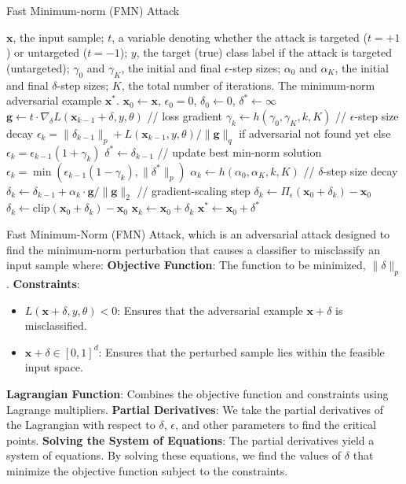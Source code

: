 \begin{algorithm}[H]
\caption{Fast Minimum-norm (FMN) Attack}
\begin{algorithmic}[1]
\Input $\mathbf{x}$, the input sample; $t$, a variable denoting whether the attack is targeted ($t = +1$) or untargeted ($t = -1$); $y$, the target (true) class label if the attack is targeted (untargeted); $\gamma_0$ and $\gamma_K$, the initial and final $\epsilon$-step sizes; $\alpha_0$ and $\alpha_K$, the initial and final $\delta$-step sizes; $K$, the total number of iterations.
\Output The minimum-norm adversarial example $\mathbf{x}^*$.
\State $\mathbf{x}_0 \gets \mathbf{x}$, $\epsilon_0 = 0$, $\delta_0 \gets 0$, $\delta^* \gets \infty$
    \State $\mathbf{g} \gets t \cdot \nabla_{\delta}L(\mathbf{x}_{k-1} + \delta, y, \theta)$ // loss gradient
    \State $\gamma_k \gets h(\gamma_0, \gamma_K, k, K)$ // $\epsilon$-step size decay
        \State $\epsilon_k = \|\delta_{k-1}\|_p + L(\mathbf{x}_{k-1}, y, \theta)/\|\mathbf{g}\|_q$ if adversarial not found yet else $\epsilon_k = \epsilon_{k-1}(1 + \gamma_k)$
    \Else
            \State $\delta^* \gets \delta_{k-1}$ // update best min-norm solution
        \EndIf
        \State $\epsilon_k = \min(\epsilon_{k-1}(1 - \gamma_k), \|\delta^*\|_p)$
    \EndIf
    \State $\alpha_k \gets h(\alpha_0, \alpha_K, k, K)$ // $\delta$-step size decay
    \State $\delta_k \gets \delta_{k-1} + \alpha_k \cdot \mathbf{g}/\|\mathbf{g}\|_2$ // gradient-scaling step
    \State $\delta_k \gets \Pi_{\epsilon}(\mathbf{x}_0 + \delta_k) - \mathbf{x}_0$
    \State $\delta_k \gets \text{clip}(\mathbf{x}_0 + \delta_k) - \mathbf{x}_0$
    \State $\mathbf{x}_k \gets \mathbf{x}_0 + \delta_k$
\EndFor
\Return $\mathbf{x}^* \gets \mathbf{x}_0 + \delta^*$
\end{algorithmic}
\end{algorithm}

Fast Minimum-Norm (FMN) Attack, which is an adversarial attack designed to find the minimum-norm perturbation that causes a classifier to misclassify an input sample where:
\textbf{Objective Function}: The function to be minimized, \( \|\delta\|_p \).
\textbf{Constraints}:
    \begin{itemize}
        \item \( L(\mathbf{x} + \delta, y, \theta) < 0 \): Ensures that the adversarial example \( \mathbf{x} + \delta \) is misclassified.
        \item \( \mathbf{x} + \delta \in [0, 1]^d \): Ensures that the perturbed sample lies within the feasible input space.
    \end{itemize}
\textbf{Lagrangian Function}: Combines the objective function and constraints using Lagrange multipliers.
\textbf{Partial Derivatives}: We take the partial derivatives of the Lagrangian with respect to \( \delta \), \( \epsilon \), and other parameters to find the critical points.
\textbf{Solving the System of Equations}: The partial derivatives yield a system of equations. By solving these equations, we find the values of \( \delta \) that minimize the objective function subject to the constraints.